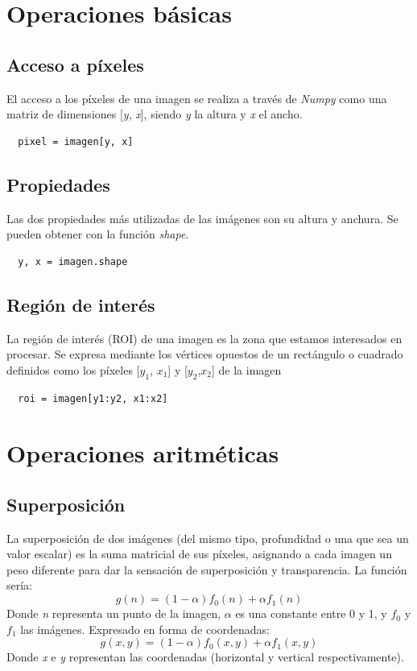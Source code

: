 \section{Operaciones básicas}
\subsection{Acceso a píxeles}
El acceso a los píxeles de una imagen se realiza a través de
\emph{Numpy} como una matriz de dimensiones [\emph{y}, \emph{x}],
siendo \emph{y} la altura y \emph{x} el ancho.
\begin{verbatim}
  pixel = imagen[y, x]
\end{verbatim}

\subsection{Propiedades}
Las dos propiedades más utilizadas de las imágenes son su altura y
anchura.  Se pueden obtener con la función \emph{shape}.
\begin{verbatim}
  y, x = imagen.shape
\end{verbatim}

\subsection{Región de interés}
La región de interés (ROI) de una imagen es la zona que estamos
interesados en procesar. Se expresa mediante los vértices opuestos de
un rectángulo o cuadrado definidos como los píxeles [$y_1$, $x_1$] y
[$y_2$,$x_2$] de la imagen
\begin{verbatim}
  roi = imagen[y1:y2, x1:x2]
\end{verbatim}

\section{Operaciones aritméticas}
\subsection{Superposición}
La superposición de dos imágenes (del mismo tipo, profundidad o una
que sea un valor escalar) es la suma matricial de sus píxeles,
asignando a cada imagen un peso diferente para dar la sensación de
superposición y transparencia. La función sería:
\begin{equation*}
  g(n) = (1 - \alpha)f_0(n) + \alpha f_1(n)
\end{equation*}
Donde \emph{n} representa un punto de la imagen, \emph{$\alpha$} es
una constante entre 0 y 1, y \emph{$f_0$} y \emph{$f_1$} las imágenes.
Expresado en forma de coordenadas:
\begin{equation*}
  g(x, y) = (1 - \alpha)f_0(x, y) + \alpha f_1(x, y)
\end{equation*}
Donde \emph{x} e \emph{y} representan las coordenadas (horizontal y
vertical respectivamente).


